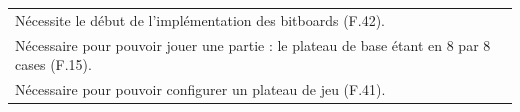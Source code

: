 \documentclass[a4paper,12pt]{article}
\begin{document}
\begin{tabularx}{\textwidth}{|X|}
    \arrayrulecolor{CornflowerBlue}
    Nécessite le début de l’implémentation des bitboards (F.42).                                                                                                                                         \\
    Nécessaire pour pouvoir jouer une partie : le plateau de base étant en 8 par 8 cases (F.15).                                                                                                         \\
    Nécessaire pour pouvoir configurer un plateau de jeu (F.41).                                                                                                                                         \\
    \hline
\end{tabularx}

\vspace{1cm}
\end{document}
